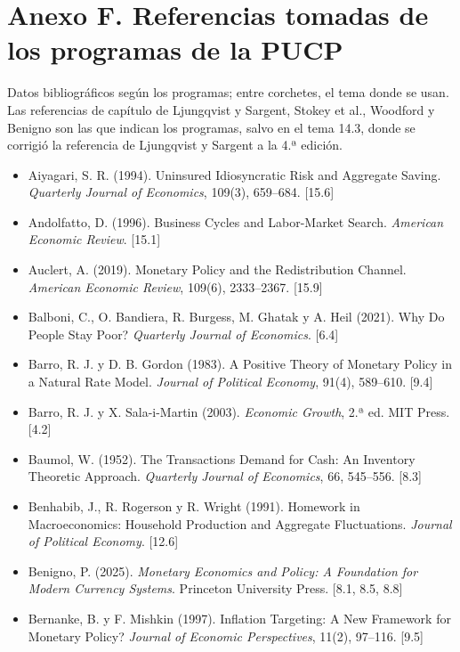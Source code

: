 \documentclass[11pt,a4paper]{article}
\begin{document}
\section*{Anexo F. Referencias tomadas de los programas de la PUCP}

Datos bibliográficos según los programas; entre corchetes, el tema donde se
usan. Las referencias de capítulo de Ljungqvist y Sargent, Stokey et al.,
Woodford y Benigno son las que indican los programas, salvo en el tema 14.3,
donde se corrigió la referencia de Ljungqvist y Sargent a la 4.ª edición.

\medskip
{\small
\begin{itemize}[leftmargin=1.4em,itemsep=1pt,label={}]
\item Aiyagari, S. R. (1994). Uninsured Idiosyncratic Risk and Aggregate Saving. \emph{Quarterly Journal of Economics}, 109(3), 659--684. [15.6]
\item Andolfatto, D. (1996). Business Cycles and Labor-Market Search. \emph{American Economic Review}. [15.1]
\item Auclert, A. (2019). Monetary Policy and the Redistribution Channel. \emph{American Economic Review}, 109(6), 2333--2367. [15.9]
\item Balboni, C., O. Bandiera, R. Burgess, M. Ghatak y A. Heil (2021). Why Do People Stay Poor? \emph{Quarterly Journal of Economics}. [6.4]
\item Barro, R. J. y D. B. Gordon (1983). A Positive Theory of Monetary Policy in a Natural Rate Model. \emph{Journal of Political Economy}, 91(4), 589--610. [9.4]
\item Barro, R. J. y X. Sala-i-Martin (2003). \emph{Economic Growth}, 2.ª ed. MIT Press. [4.2]
\item Baumol, W. (1952). The Transactions Demand for Cash: An Inventory Theoretic Approach. \emph{Quarterly Journal of Economics}, 66, 545--556. [8.3]
\item Benhabib, J., R. Rogerson y R. Wright (1991). Homework in Macroeconomics: Household Production and Aggregate Fluctuations. \emph{Journal of Political Economy}. [12.6]
\item Benigno, P. (2025). \emph{Monetary Economics and Policy: A Foundation for Modern Currency Systems}. Princeton University Press. [8.1, 8.5, 8.8]
\item Bernanke, B. y F. Mishkin (1997). Inflation Targeting: A New Framework for Monetary Policy? \emph{Journal of Economic Perspectives}, 11(2), 97--116. [9.5]

\end{itemize}}
\end{document}
